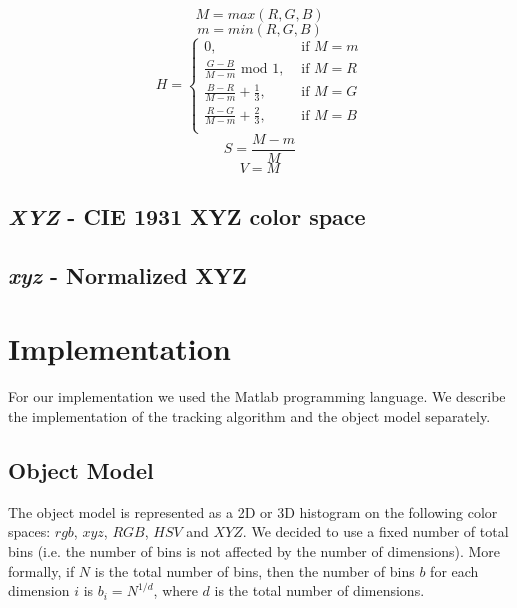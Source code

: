 \documentclass[11pt]{article}
\begin{document}
\begin{equation}
  M = max(R,G,B)
  \label{eq:M}
\end{equation}
\begin{equation}
  m = min(R,G,B)
  \label{eq:m}
\end{equation}
\begin{equation}
  H =
    \left\{\begin{array}{ll}
      0, & \textrm{~if~} M = m \\
      \frac{G-B}{M-m} \textrm{~mod~} 1,& \textrm{~if~} M = R \\
      \frac{B-R}{M-m} + \frac{1}{3},& \textrm{~if~} M = G \\
      \frac{R-G}{M-m} + \frac{2}{3},& \textrm{~if~} M = B \\      
    \end{array}\right.
  \label{eq:H}
\end{equation}
\begin{equation}
  S = \frac{M-m}{M}
  \label{eq:S}
\end{equation}
\begin{equation}
  V = M
  \label{eq:V}
\end{equation}

\subsection{\textit{XYZ} - CIE 1931 XYZ color space}

\subsection{\textit{xyz} - Normalized XYZ}

\section{Implementation} \label{sec:implementation}
For our implementation we used the Matlab programming language. We describe the
implementation of the tracking algorithm and the object model separately.

\subsection{Object Model} \label{sec:model}
The object model is represented as a 2D or 3D histogram on the following color
spaces: $rgb$, $xyz$, $RGB$, $HSV$ and $XYZ$. We decided to use a fixed number
of total bins (i.e. the number of bins is not affected by the number of
dimensions).  More formally, if $N$ is the total number of bins, then the number
of bins $b$ for each dimension $i$ is $b_i = N^{1/d}$, where $d$ is the total
number of dimensions. 
\end{document}
